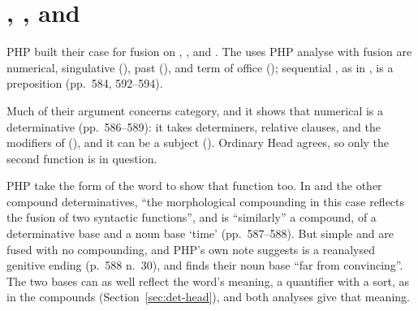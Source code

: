 %

\section{, , and }\label{sec:once}

PHP built their case for fusion on , , and . The uses PHP analyse with fusion are numerical, singulative (), past (), and term of office (); sequential , as in , is a preposition (pp.~584, 592--594).

Much of their argument concerns category, and it shows that numerical  is a determinative (pp.~586--589): it takes determiners, relative clauses, and the modifiers of  (), and it can be a subject (). Ordinary Head agrees, so only the second function is in question.

PHP take the form of the word to show that function too. In  and the other compound determinatives, \enquote{the morphological compounding in this case reflects the fusion of two syntactic functions}, and  is \enquote{similarly} a compound, of a determinative base  and a noun base  \enquote*{time} (pp.~587--588). But simple  and  are fused with no compounding, and PHP's own note suggests  is a reanalysed genitive ending (p.~588 n.~30), and \textcite[89]{wu2021exocentric} finds their noun base \enquote{far from convincing}. The two bases can as well reflect the word's meaning, a quantifier with a sort, as in the compounds (Section~\ref{sec:det-head}), and both analyses give  that meaning.

